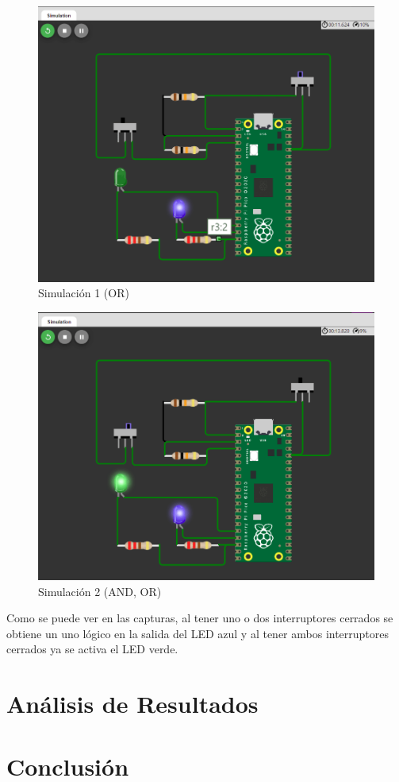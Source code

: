 \documentclass{article}
\begin{document}
    \begin{figure}[H]
        \centering
        \includegraphics[width=0.5\paperwidth]{images/wokwi-example-2-sim-1}
        \caption{Simulación 1 (OR)}
    \end{figure}

    \begin{figure}[H]
        \centering
        \includegraphics[width=0.5\paperwidth]{images/wokwi-example-2-sim-2}
        \caption{Simulación 2 (AND, OR)}
    \end{figure}

    Como se puede ver en las capturas, al tener uno o dos interruptores cerrados se obtiene un uno lógico en la salida del LED azul y al tener ambos interruptores cerrados ya se activa el LED verde.


    \section{Análisis de Resultados}\label{sec:análisis-de-resultados}



    \section{Conclusión}\label{sec:conclusion}



    \printbibliography
\end{document}
